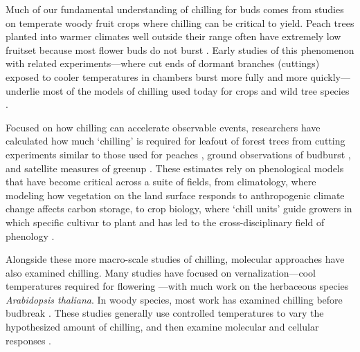 \documentclass[11pt]{article}
\begin{document}
Much of our fundamental understanding of chilling for buds comes from studies on temperate woody fruit crops where chilling can be critical to yield. Peach trees planted into warmer climates well outside their range often have extremely low fruitset because most flower buds do not burst \citep{weinberger,overcash1955effects,erez1971improved}. Early studies of this phenomenon with related experiments---where cut ends of dormant branches (cuttings) exposed to cooler temperatures in chambers burst more fully and more quickly---underlie most of the models of chilling used today for crops and wild tree species \citep[][]{weinberger,ospreebbms}. %

Focused on how chilling can accelerate observable events, researchers have calculated how much `chilling' is required for leafout of forest trees from cutting experiments similar to those used for peaches \citep[reviewed in][]{ospreebbms}, ground observations of budburst \citep{Luedeling2009}, and satellite measures of greenup \citep{kaduk2011predicting}. These estimates rely on phenological models that have become critical across a suite of fields, from climatology, where modeling how vegetation on the land surface responds to anthropogenic climate change affects carbon storage, to crop biology, where `chill units'  guide growers in which specific cultivar to plant and has led to the cross-disciplinary field of phenology \citep{Schwartz:1994he,Cleland:2007or,pmp}. %

Alongside these more macro-scale studies of chilling, molecular approaches have also examined chilling. Many studies have focused on vernalization---cool temperatures required for flowering \citep{kim2009vernalization}---with much work on the herbaceous species \emph{Arabidopsis thaliana}. In woody species, most work has examined chilling before budbreak \citep[][]{azeez2021early,cai2024molecular}. These studies generally use controlled temperatures to vary the hypothesized amount of chilling, and then examine molecular and cellular responses \citep[e.g.,][and see Fig. \ref{fig:modelsketch}]{pan2021aba,azeez2021early,cai2024molecular}.
\end{document}
